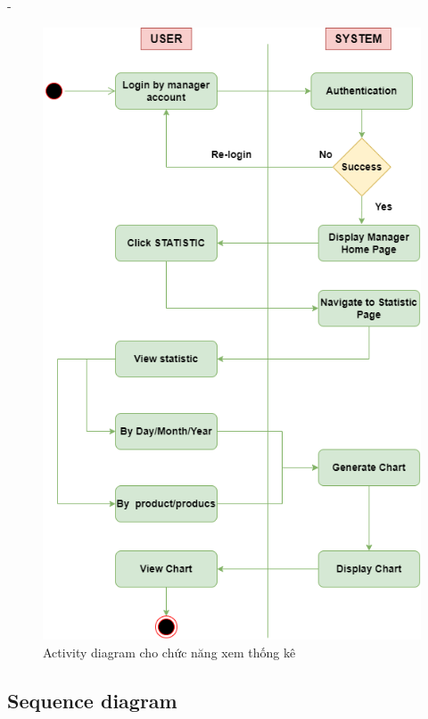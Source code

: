 \begin {list} {-}{}
\begin{figure}[h]
    \centering
    \includegraphics[scale=0.6]{images/hieu/chap-3/Statistic-activity-diagram.png}
    \caption{Activity diagram cho chức năng xem thống kê}
\end{figure}
\newpage
\subsection{Sequence diagram}

\end{list}
